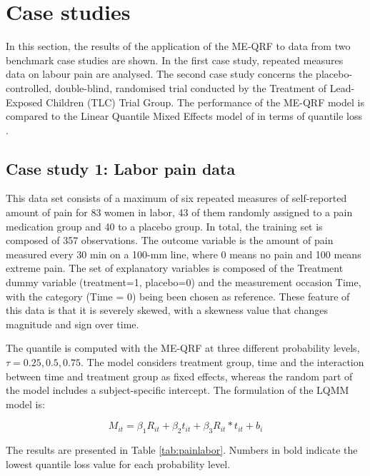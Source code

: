 \section{Case studies}

In this section, the results of the application of the ME-QRF to data from two benchmark case studies are shown. In the first case study, repeated measures data on labour pain \citep{geraci2007quantile, farcomeni2012quantile} are analysed.  The second case study concerns the placebo-controlled, double-blind, randomised trial conducted by the Treatment of Lead- Exposed Children (TLC) Trial Group.
The performance of the ME-QRF model is compared to the Linear Quantile Mixed Effects model of \cite{geraci2014linear} in terms of quantile loss \citep{gonzalez2004forecasting}.



\subsection{Case study 1: Labor pain data}

This data set consists of a maximum of six repeated measures of self-reported amount of pain for 83 women in labor, 43 of them randomly assigned to a pain medication group and 40 to a placebo group. In total, the training set is composed of 357 observations.  The outcome variable is the amount of pain measured every 30 min on a 100-mm line, where 0 means no pain and 100 means extreme pain. The set of explanatory variables is composed of the Treatment dummy variable (treatment=1, placebo=0) and the measurement occasion Time, with the category (Time = 0) being been chosen as reference. These feature of this data is that it is severely skewed, with a skewness value that changes magnitude and sign over time.

The quantile is computed with the ME-QRF at three different probability levels, $\tau= 0.25, 0.5, 0.75$. The model considers treatment group, time and the interaction between time and treatment group as fixed effects, whereas the random part of the model includes a subject-specific intercept.
The formulation of the LQMM model is:

\begin{equation}
 M_{it}=\beta_1 R_{it} + \beta_2 t_{it} +\beta_3 R_{it} * t_{it} + b_i
\end{equation}

The results are presented in Table \ref{tab:painlabor}. Numbers in bold indicate the lowest quantile loss value for each probability level.

